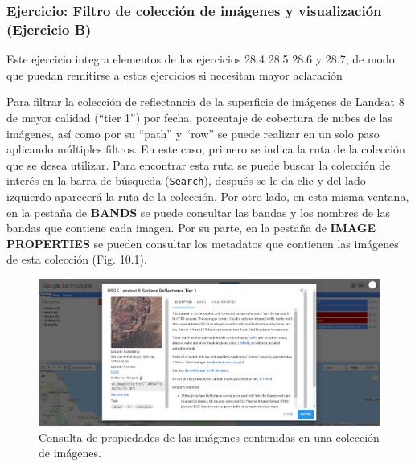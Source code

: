 \documentclass[
  12pt,
  letterpaper,
  twoside]{book}
\begin{document}
\hypertarget{ejercicio-filtro-de-colecciuxf3n-de-imuxe1genes-y-visualizaciuxf3n-ejercicio-b}{%
\subsubsection*{Ejercicio: Filtro de colección de imágenes y visualización (Ejercicio B)}\label{ejercicio-filtro-de-colecciuxf3n-de-imuxe1genes-y-visualizaciuxf3n-ejercicio-b}}

Este ejercicio integra elementos de los ejercicios 28.4 28.5 28.6 y 28.7, de modo que puedan remitirse a estos ejercicios si necesitan mayor aclaración

Para filtrar la colección de reflectancia de la superficie de imágenes de Landsat 8 de mayor calidad (``tier 1'') por fecha, porcentaje de cobertura de nubes de las imágenes, así como por su ``path'' y ``row'' se puede realizar en un solo paso aplicando múltiples filtros. En este caso, primero se indica la ruta de la colección que se desea utilizar. Para encontrar esta ruta se puede buscar la colección de interés en la barra de búsqueda (\texttt{Search}), después se le da clic y del lado izquierdo aparecerá la ruta de la colección. Por otro lado, en esta misma ventana, en la pestaña de \textbf{BANDS} se puede consultar las bandas y los nombres de las bandas que contiene cada imagen. Por su parte, en la pestaña de \textbf{IMAGE PROPERTIES} se pueden consultar los metadatos que contienen las imágenes de esta colección (Fig. 10.1).

\begin{figure}[btp]

{\centering \includegraphics[width=1\linewidth]{Img/Ruta_coleccion} 

}

\caption{Consulta de propiedades de las imágenes contenidas en una colección de imágenes.}\label{fig:unnamed-chunk-155}
\end{figure}
\end{document}
